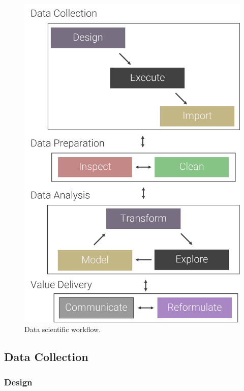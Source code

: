 \documentclass[
]{book}
\begin{document}
\begin{figure}

{\centering \includegraphics[width=118.67in]{images/data_science_workflow} 

}

\caption{Data scientific workflow.}\label{fig:ds-workflow}
\end{figure}

\hypertarget{data-collection2}{%
\subsection{Data Collection}\label{data-collection2}}

\hypertarget{design}{%
\subsubsection{Design}\label{design}}
\end{document}
